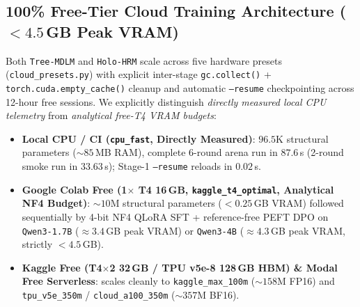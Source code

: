 \documentclass[11pt]{article}
\begin{document}
\subsection{100\% Free-Tier Cloud Training Architecture ($<4.5$\,GB Peak VRAM)}
Both \texttt{Tree-MDLM} and \texttt{Holo-HRM} scale across five hardware presets (\texttt{cloud\_presets.py}) with explicit inter-stage \texttt{gc.collect()} + \texttt{torch.cuda.empty\_cache()} cleanup and automatic \texttt{--resume} checkpointing across 12-hour free sessions. We explicitly distinguish \emph{directly measured local CPU telemetry} from \emph{analytical free-T4 VRAM budgets}:
\begin{itemize}[leftmargin=1.4em]
  \item \textbf{Local CPU / CI (\texttt{cpu\_fast}, Directly Measured)}: $96.5$K structural parameters ($\sim 85$\,MB RAM), complete 6-round arena run in $87.6$\,s (2-round smoke run in $33.63$\,s); Stage-1 \texttt{--resume} reloads in $0.02$\,s.
  \item \textbf{Google Colab Free (1$\times$ T4 16\,GB, \texttt{kaggle\_t4\_optimal}, Analytical NF4 Budget)}: $\sim 10$M structural parameters ($<0.25$\,GB VRAM) followed sequentially by 4-bit NF4 QLoRA SFT + reference-free PEFT DPO \citep{dettmers2023qlora,rafailov2023dpo} on \texttt{Qwen3-1.7B} \citep{yang2025qwen3} ($\approx 3.4$\,GB peak VRAM) or \texttt{Qwen3-4B} ($\approx 4.3$\,GB peak VRAM, strictly $<4.5$\,GB).
  \item \textbf{Kaggle Free (T4$\times$2 32\,GB / TPU v5e-8 128\,GB HBM) \& Modal Free Serverless}: scales cleanly to \texttt{kaggle\_max\_100m} ($\sim 158$M FP16) and \texttt{tpu\_v5e\_350m} / \texttt{cloud\_a100\_350m} ($\sim 357$M BF16).
\end{itemize}

\end{document}
